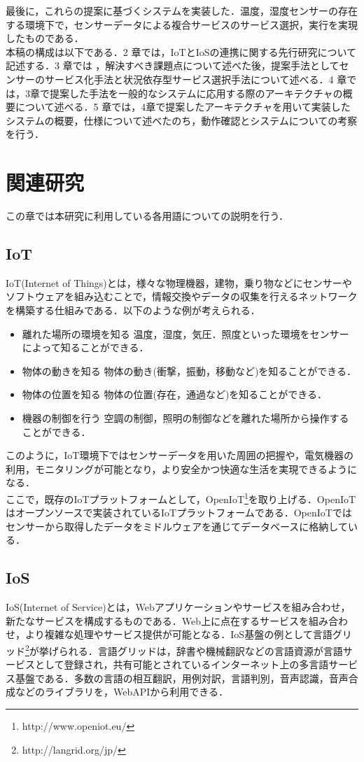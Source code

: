 \documentclass{kuisthesis}			%
\begin{document}
最後に，これらの提案に基づくシステムを実装した．温度，湿度センサーの存在する環境下で，センサーデータによる複合サービスのサービス選択，実行を実現したものである．\\
本稿の構成は以下である．2 章では，IoTとIoSの連携に関する先行研究について記述する．3 章では ，解決すべき課題点について述べた後，提案手法としてセンサーのサービス化手法と状況依存型サービス選択手法について述べる．4 章では，3章で提案した手法を一般的なシステムに応用する際のアーキテクチャの概要について述べる．5 章では，4章で提案したアーキテクチャを用いて実装したシステムの概要，仕様について述べたのち，動作確認とシステムについての考察を行う．

\section{関連研究}\label{sec-structure}
この章では本研究に利用している各用語についての説明を行う．

\subsection{IoT}\label{subsec-abstract}
IoT(Internet of Things)とは，様々な物理機器，建物，乗り物などにセンサーやソフトウェアを組み込むことで，情報交換やデータの収集を行えるネットワークを構築する仕組みである．以下のような例が考えられる．
\begin{itemize}
\item 離れた場所の環境を知る
温度，湿度，気圧．照度といった環境をセンサーによって知ることができる．
\item 物体の動きを知る
物体の動き(衝撃，振動，移動など)を知ることができる．
\item 物体の位置を知る
物体の位置(存在，通過など)を知ることができる．
\item 機器の制御を行う
空調の制御，照明の制御などを離れた場所から操作することができる．
\end{itemize}
このように，IoT環境下ではセンサーデータを用いた周囲の把握や，電気機器の利用，モニタリングが可能となり，より安全かつ快適な生活を実現できるようになる．\\
ここで，既存のIoTプラットフォームとして，OpenIoT\footnote{http://www.openiot.eu/}を取り上げる．OpenIoTはオープンソースで実装されているIoTプラットフォームである．OpenIoTではセンサーから取得したデータをミドルウェアを通じてデータベースに格納している．

\subsection{IoS}\label{subsec-abstract}
IoS(Internet of Service)とは，Webアプリケーションやサービスを組み合わせ，新たなサービスを構成するものである．Web上に点在するサービスを組み合わせ，より複雑な処理やサービス提供が可能となる．IoS基盤の例として言語グリッド\footnote{http://langrid.org/jp/}が挙げられる．言語グリッドは，辞書や機械翻訳などの言語資源が言語サービスとして登録され，共有可能とされているインターネット上の多言語サービス基盤である．多数の言語の相互翻訳，用例対訳，言語判別，音声認識，音声合成などのライブラリを，WebAPIから利用できる．
\end{document}
